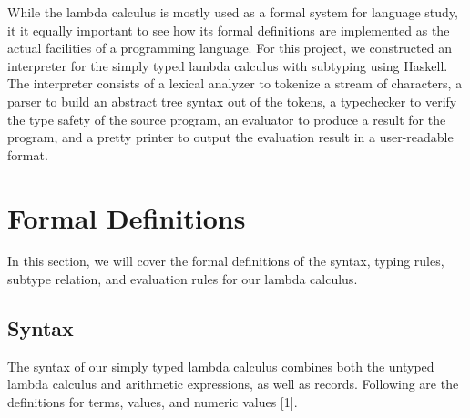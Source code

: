 \documentclass[fleqn, 11pt]{article}
\begin{document}
While the lambda calculus is mostly used as a formal system for language study, it it equally important to see how its formal definitions are 
implemented as the actual facilities of a programming language. For this project, we constructed an interpreter for the simply typed 
lambda calculus with subtyping using Haskell. The interpreter consists of a lexical analyzer to tokenize a stream of characters, a parser to build an 
abstract tree syntax out of the tokens, a typechecker to verify the type safety of the source program, an evaluator to produce a result for 
the program, and a pretty printer to output the evaluation result in a user-readable format. 

\section{Formal Definitions}

In this section, we will cover the formal definitions of the syntax, typing rules, subtype relation, and evaluation rules for our 
lambda calculus.

\subsection{Syntax}

The syntax of our simply typed lambda calculus combines both the untyped lambda calculus and arithmetic expressions, as 
well as records. Following are the definitions for terms, values, and numeric values [1].
\end{document}
